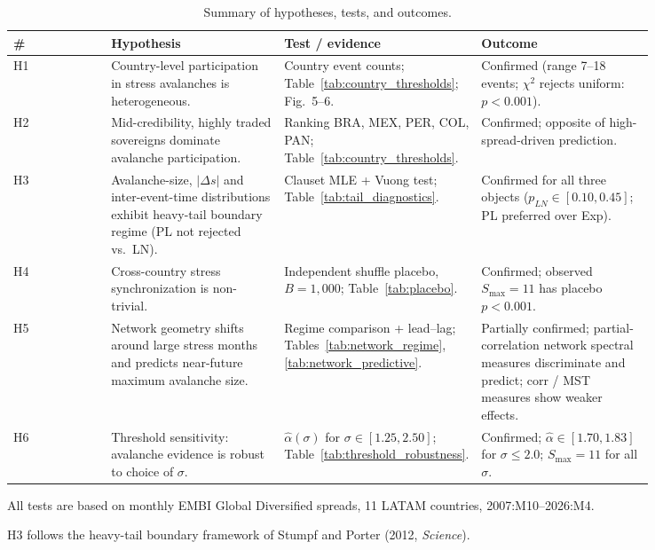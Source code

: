 \begin{table}[!htbp]
\centering
\footnotesize
\begin{threeparttable}
\caption{Summary of hypotheses, tests, and outcomes.}
\label{tab:hypothesis_summary}
\begin{tabular}{lp{0.27\linewidth}p{0.30\linewidth}p{0.27\linewidth}}
\toprule
\# & Hypothesis & Test / evidence & Outcome \\
\midrule
H1 & Country-level participation in stress avalanches is heterogeneous. & Country event counts; Table~\ref{tab:country_thresholds}; Fig.~5--6. & Confirmed (range 7--18 events; $\chi^2$ rejects uniform: $p<0.001$). \\
H2 & Mid-credibility, highly traded sovereigns dominate avalanche participation. & Ranking BRA, MEX, PER, COL, PAN; Table~\ref{tab:country_thresholds}. & Confirmed; opposite of high-spread-driven prediction. \\
H3 & Avalanche-size, $|\Delta s|$ and inter-event-time distributions exhibit heavy-tail boundary regime (PL not rejected vs.\ LN). & Clauset MLE + Vuong test; Table~\ref{tab:tail_diagnostics}. & Confirmed for all three objects ($p_{LN}\in[0.10, 0.45]$; PL preferred over Exp). \\
H4 & Cross-country stress synchronization is non-trivial. & Independent shuffle placebo, $B=1{,}000$; Table~\ref{tab:placebo}. & Confirmed; observed $S_{\max}=11$ has placebo $p<0.001$. \\
H5 & Network geometry shifts around large stress months and predicts near-future maximum avalanche size. & Regime comparison + lead--lag; Tables~\ref{tab:network_regime}, \ref{tab:network_predictive}. & Partially confirmed; partial-correlation network spectral measures discriminate and predict; corr / MST measures show weaker effects. \\
H6 & Threshold sensitivity: avalanche evidence is robust to choice of $\sigma$. & $\hat{\alpha}(\sigma)$ for $\sigma\in[1.25, 2.50]$; Table~\ref{tab:threshold_robustness}. & Confirmed; $\hat{\alpha}\in[1.70, 1.83]$ for $\sigma\leq 2.0$; $S_{\max}=11$ for all $\sigma$. \\
\bottomrule
\end{tabular}
\begin{tablenotes}\footnotesize
\item All tests are based on monthly EMBI Global Diversified spreads, 11 LATAM countries, 2007:M10--2026:M4.
\item H3 follows the heavy-tail boundary framework of Stumpf and Porter (2012, \emph{Science}).
\end{tablenotes}
\end{threeparttable}
\end{table}
